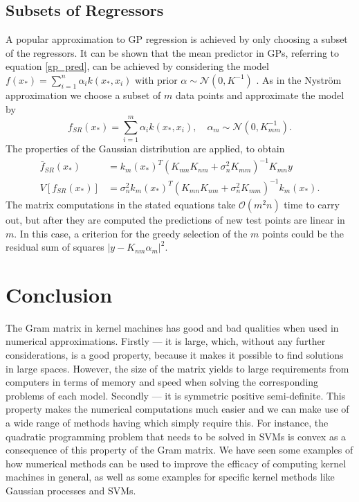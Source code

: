 \documentclass{article}
\theoremstyle{plain}
\theoremstyle{definition}
\theoremstyle{remark}
\begin{document}
\subsection{Subsets of Regressors}
A popular approximation to GP regression is achieved by only choosing a subset of the regressors.
It can be shown that the mean predictor in GPs, referring to equation \eqref{gp_pred}, can be achieved by considering the model $f(x_*) = \sum_{i = 1}^{n}\alpha_i k(x_*, x_i)$ with prior $\alpha \sim \mathcal{N}(0, K^{-1})$ \cite{rasmussen}.
As in the Nyström approximation we choose a subset of $m$ data points and approximate the model by
\begin{equation*}
        f_{SR}(x_*) = \sum_{ i = 1}^{m}\alpha_i k(x_*, x_i), \quad \alpha_m \sim \mathcal{N}(0, K_{mm}^{-1}).
\end{equation*}
The properties of the Gaussian distribution are applied, to obtain
\begin{align*}
        \bar{f}_{SR}(x_*) &= k_m (x_*)^T (K_{mn}K_{nm} + \sigma_n^2 K_{mm})^{-1}K_{mn}y \\
        V[f_{SR}(x_*)] &= \sigma_n^2 k_m (x_*)^T(K_{mn}K_{nm} + \sigma_n^2 K_{mm})^{-1} k_m(x_*).
\end{align*}
The matrix computations in the stated equations take $\mathcal{O}(m^2n)$ time to carry out, but after they are computed the predictions of new test points are linear in $m$.
In this case, a criterion for the greedy selection of the $m$ points could be the residual sum of squares $|y - K_{nm}\alpha_m|^2$.



\section{Conclusion}
The Gram matrix in kernel machines has good and bad qualities when used in numerical approximations.
Firstly — it is large, which, without any further considerations, is a good property, because it makes it possible to find solutions in large spaces. However, the size of the matrix yields to large requirements from computers in terms of memory and speed when solving the corresponding problems of each model. 
Secondly — it is symmetric positive semi-definite.
This property makes the numerical computations much easier and we can make use of a wide range of methods having which simply require this. For instance, the quadratic programming problem that needs to be solved in SVMs is convex as a consequence of this property of the Gram matrix. We have seen some examples of how numerical methods can be used to improve the efficacy of computing kernel machines in general, as well as some examples for specific kernel methods like Gaussian processes and SVMs. 
\end{document}
